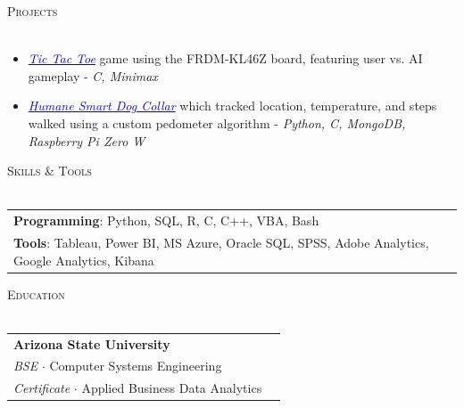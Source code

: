 \documentclass[letterpaper]{article}
\newcommand{\lineunder} {
    \vspace*{-8pt} \\
    \hspace*{-18pt} \hrulefill \\
}
\newcommand{\header}[1] {
    {\hspace*{-18pt}\vspace*{6pt} \textsc{#1}}
    \vspace*{-6pt} \lineunder
}
\begin{document}
\header{\large{Projects}}
\vspace{-1mm}
\begin{itemize} [itemsep=1pt, leftmargin=*]
    \item \href{https://github.com/adityamujumdar/AI-based-Tic-Tac-Toe}{\textcolor{blue}{\textit{Tic Tac Toe}}} game using the FRDM-KL46Z board, featuring user vs. AI gameplay - \textit {C, Minimax}
    \item \href{https://github.com/adityamujumdar/Smart-Dog-Collar-3000}{\textcolor{blue}{\textit{Humane Smart Dog Collar}}} which tracked location, temperature, and steps walked using a custom pedometer algorithm - \textit{Python, C, MongoDB, Raspberry Pi Zero W }
\end{itemize}

\header{\large{Skills \& Tools}}
\vspace{2mm}
\begin{tabular}{ l l }
    \textbf{Programming}:  Python, SQL, R, C, C++, VBA, Bash                                                    \\
    \textbf{Tools}: Tableau, Power BI, MS Azure, Oracle SQL, SPSS, Adobe Analytics, Google Analytics, Kibana \\
\end{tabular}
\vspace{1mm}

\header{\large{Education}}
\vspace{2mm}

\begin{tabular}{ l l }
    \textbf{Arizona State University}                                                                 \\
    \textit{BSE} $\cdot$ Computer Systems Engineering \textit \hfill            \\
    \textit{Certificate} $\cdot$ Applied Business Data Analytics \textit \hfill \\
\end{tabular}
\end{document}
